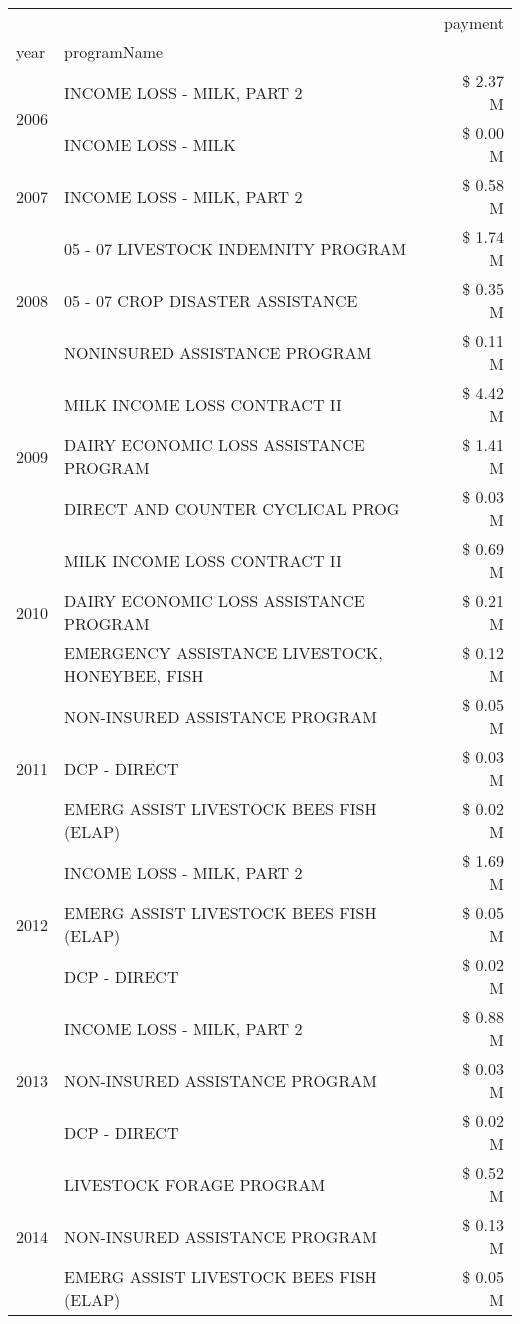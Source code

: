 \begin{tabular}{llr}
\toprule
 &  & payment \\
year & programName &  \\
\midrule
\multirow[t]{2}{*}{2006} & INCOME LOSS - MILK, PART 2 & \$ 2.37 M \\
 & INCOME LOSS - MILK & \$ 0.00 M \\
\cline{1-3}
2007 & INCOME LOSS - MILK, PART 2 & \$ 0.58 M \\
\cline{1-3}
\multirow[t]{3}{*}{2008} & 05 - 07 LIVESTOCK INDEMNITY PROGRAM & \$ 1.74 M \\
 & 05 - 07 CROP DISASTER ASSISTANCE & \$ 0.35 M \\
 & NONINSURED ASSISTANCE PROGRAM & \$ 0.11 M \\
\cline{1-3}
\multirow[t]{3}{*}{2009} & MILK INCOME LOSS CONTRACT II & \$ 4.42 M \\
 & DAIRY ECONOMIC LOSS ASSISTANCE PROGRAM & \$ 1.41 M \\
 & DIRECT AND COUNTER CYCLICAL PROG & \$ 0.03 M \\
\cline{1-3}
\multirow[t]{3}{*}{2010} & MILK INCOME LOSS CONTRACT II & \$ 0.69 M \\
 & DAIRY ECONOMIC LOSS ASSISTANCE PROGRAM & \$ 0.21 M \\
 & EMERGENCY ASSISTANCE LIVESTOCK, HONEYBEE, FISH & \$ 0.12 M \\
\cline{1-3}
\multirow[t]{3}{*}{2011} & NON-INSURED ASSISTANCE PROGRAM & \$ 0.05 M \\
 & DCP - DIRECT & \$ 0.03 M \\
 & EMERG ASSIST LIVESTOCK BEES FISH (ELAP) & \$ 0.02 M \\
\cline{1-3}
\multirow[t]{3}{*}{2012} & INCOME LOSS - MILK, PART 2 & \$ 1.69 M \\
 & EMERG ASSIST LIVESTOCK BEES FISH (ELAP) & \$ 0.05 M \\
 & DCP - DIRECT & \$ 0.02 M \\
\cline{1-3}
\multirow[t]{3}{*}{2013} & INCOME LOSS - MILK, PART 2 & \$ 0.88 M \\
 & NON-INSURED ASSISTANCE PROGRAM & \$ 0.03 M \\
 & DCP - DIRECT & \$ 0.02 M \\
\cline{1-3}
\multirow[t]{3}{*}{2014} & LIVESTOCK FORAGE PROGRAM & \$ 0.52 M \\
 & NON-INSURED ASSISTANCE PROGRAM & \$ 0.13 M \\
 & EMERG ASSIST LIVESTOCK BEES FISH (ELAP) & \$ 0.05 M \\

\end{tabular}
